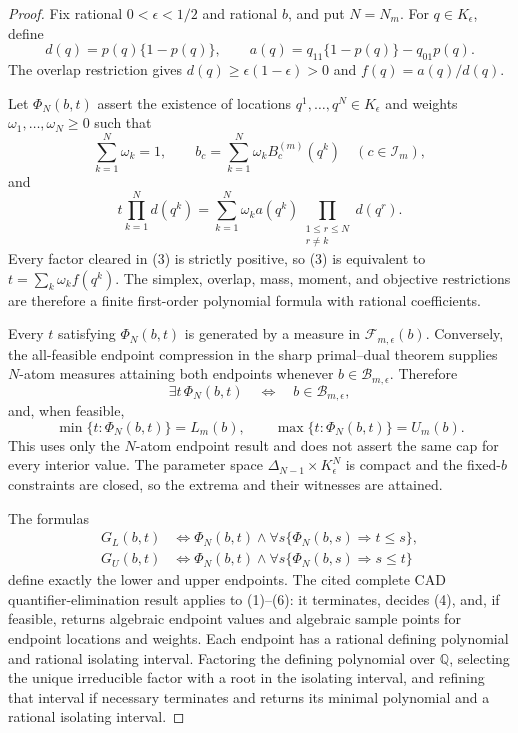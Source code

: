 \documentclass{article}
\begin{document}
\begin{proof}
Fix rational \(0<\epsilon<1/2\) and rational \(b\), and put \(N=N_m\).  For \(q\in K_{\epsilon}\), define
\[
 d(q)=p(q)\{1-p(q)\},
 \qquad a(q)=q_{11}\{1-p(q)\}-q_{01}p(q).
\tag{1}
\]
The overlap restriction gives \(d(q)\geq\epsilon(1-\epsilon)>0\) and \(f(q)=a(q)/d(q)\).

Let \(\Phi_N(b,t)\) assert the existence of locations \(q^1,\ldots,q^N\in K_{\epsilon}\) and weights \(\omega_1,\ldots,\omega_N\geq0\) such that
\[
 \sum_{k=1}^N\omega_k=1,
 \qquad
 b_c=\sum_{k=1}^N\omega_kB_c^{(m)}(q^k)
 \quad(c\in\mathcal I_m),
\tag{2}
\]
and
\[
 t\prod_{k=1}^Nd(q^k)
 =\sum_{k=1}^N\omega_ka(q^k)
   \prod_{\substack{1\leq r\leq N\\r\neq k}}d(q^r).
\tag{3}
\]
Every factor cleared in (3) is strictly positive, so (3) is equivalent to \(t=\sum_k\omega_kf(q^k)\).  The simplex, overlap, mass, moment, and objective restrictions are therefore a finite first-order polynomial formula with rational coefficients.

Every \(t\) satisfying \(\Phi_N(b,t)\) is generated by a measure in \(\mathcal F_{m,\epsilon}(b)\).  Conversely, the all-feasible endpoint compression in the sharp primal--dual theorem supplies \(N\)-atom measures attaining both endpoints whenever \(b\in\mathcal B_{m,\epsilon}\).  Therefore
\[
 \exists t\,\Phi_N(b,t)\quad\Longleftrightarrow\quad b\in\mathcal B_{m,\epsilon},
\tag{4}
\]
and, when feasible,
\[
 \min\{t:\Phi_N(b,t)\}=L_m(b),
 \qquad
 \max\{t:\Phi_N(b,t)\}=U_m(b).
\tag{5}
\]
This uses only the \(N\)-atom endpoint result and does not assert the same cap for every interior value.  The parameter space \(\Delta_{N-1}\times K_{\epsilon}^N\) is compact and the fixed-\(b\) constraints are closed, so the extrema and their witnesses are attained.

The formulas
\[
 \begin{split}
 G_L(b,t)&\Longleftrightarrow
 \Phi_N(b,t)\wedge\forall s\{\Phi_N(b,s)\Rightarrow t\leq s\},\\
 G_U(b,t)&\Longleftrightarrow
 \Phi_N(b,t)\wedge\forall s\{\Phi_N(b,s)\Rightarrow s\leq t\}
 \end{split}
\tag{6}
\]
define exactly the lower and upper endpoints.  The cited complete CAD quantifier-elimination result applies to (1)--(6): it terminates, decides (4), and, if feasible, returns algebraic endpoint values and algebraic sample points for endpoint locations and weights.  Each endpoint has a rational defining polynomial and rational isolating interval.  Factoring the defining polynomial over \(\mathbb Q\), selecting the unique irreducible factor with a root in the isolating interval, and refining that interval if necessary terminates and returns its minimal polynomial and a rational isolating interval.


\end{proof}
\end{document}
